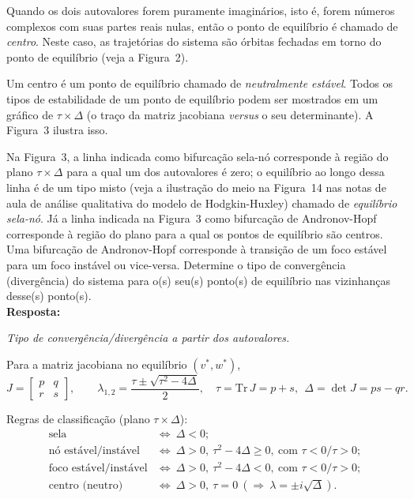 \documentclass[english,11pt,a4paper]{article}
\begin{document}
	Quando os dois autovalores forem puramente imaginários, isto é, forem números complexos com suas partes reais nulas, então o ponto de equilíbrio é chamado de \textit{centro}. Neste caso, as trajetórias do sistema são órbitas fechadas em torno do ponto de equilíbrio (veja a Figura~2).
	
	Um centro é um ponto de equilíbrio chamado de \textit{neutralmente estável}. Todos os tipos de estabilidade de um ponto de equilíbrio podem ser mostrados em um gráfico de $\tau \times \Delta$ (o traço da matriz jacobiana \textit{versus} o seu determinante). A Figura~3 ilustra isso.
	
	Na Figura~3, a linha indicada como bifurcação sela-nó corresponde à região do plano $\tau \times \Delta$ para a qual um dos autovalores é zero; o equilíbrio ao longo dessa linha é de um tipo misto (veja a ilustração do meio na Figura~14 nas notas de aula de análise qualitativa do modelo de Hodgkin-Huxley) chamado de \textit{equilíbrio sela-nó}. Já a linha indicada na Figura~3 como bifurcação de Andronov-Hopf corresponde à região do plano para a qual os pontos de equilíbrio são centros. Uma bifurcação de Andronov-Hopf corresponde à transição de um foco estável para um foco instável ou vice-versa. Determine o tipo de convergência (divergência) do sistema para o(s) seu(s) ponto(s) de equilíbrio nas vizinhanças desse(s) ponto(s).\\
	
	\noindent\textbf{Resposta:}
	
	\noindent\textit{Tipo de convergência/divergência a partir dos autovalores.}
	
	\noindent Para a matriz jacobiana no equilíbrio \((v^\ast,w^\ast)\),
	\[
	J=\begin{bmatrix}p & q\\ r & s\end{bmatrix},
	\qquad
	\lambda_{1,2}=\frac{\tau\pm\sqrt{\tau^2-4\Delta}}{2},
	\quad
	\tau=\mathrm{Tr}\,J=p+s,\ \ \Delta=\det J=ps-qr .
	\]
	
	\noindent Regras de classificação (plano \(\tau\times\Delta\)):
	\[
	\begin{array}{ll}
		\text{sela} & \Leftrightarrow\ \Delta<0;\\[2pt]
		\text{nó estável/instável} & \Leftrightarrow\ \Delta>0,\ \tau^2-4\Delta\ge 0,\ \text{com } \tau<0/\tau>0;\\[2pt]
		\text{foco estável/instável} & \Leftrightarrow\ \Delta>0,\ \tau^2-4\Delta<0,\ \text{com } \tau<0/\tau>0;\\[2pt]
		\text{centro (neutro)} & \Leftrightarrow\ \Delta>0,\ \tau=0\ (\Rightarrow\ \lambda=\pm i\sqrt{\Delta}).
	\end{array}
	\]
	
\end{document}
